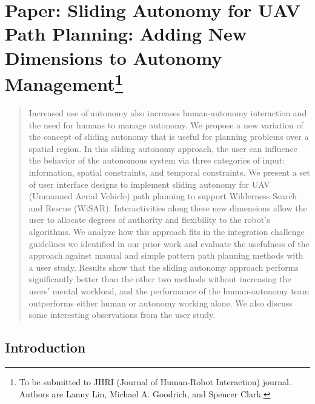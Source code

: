 \chapter[Paper: Sliding Autonomy for UAV Path Planning: Adding New Dimensions to Autonomy Management]{Paper: Sliding Autonomy for UAV Path Planning: Adding New Dimensions to Autonomy Management\footnote {To be submitted to JHRI (Journal of Human-Robot Interaction) journal. Authors are Lanny Lin, Michael A. Goodrich, and Spencer Clark.}}
\label{chap:JHRI2014}

\begin{abstract}
Increased use of autonomy also increases human-autonomy interaction and the need for humans to manage autonomy. We propose a new variation of the concept of sliding autonomy that is useful for planning problems over a spatial region. In this sliding autonomy approach, the user can influence the behavior of the autonomous system via three categories of input: information, spatial constraints, and temporal constraints. We present a set of user interface designs to implement sliding autonomy for UAV (Unmanned Aerial Vehicle) path planning to support Wilderness Search and Rescue (WiSAR). Interactivities along these new dimensions allow the user to allocate degrees of authority and flexibility to the robot's algorithms. We analyze how this approach fits in the integration challenge guidelines we identified in our prior work and evaluate the usefulness of the approach against manual and simple pattern path planning methods with a user study. Results show that the sliding autonomy approach performs significantly better than the other two methods without increasing the users' mental workload, and the performance of the human-autonomy team outperforms either human or autonomy working alone. We also discuss some interesting observations from the user study.
\end{abstract}



\section{Introduction}
\label{sec:Introduction6}

